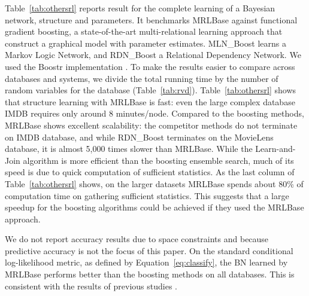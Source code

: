\documentclass{acm_proc_article-sp}
\begin{document}
Table~\ref{tab:othersrl} reports result for the complete learning of a Bayesian network, structure and parameters. It
benchmarks MRLBase against functional gradient boosting, a state-of-the-art  multi-relational learning approach that construct a graphical model with parameter estimates\cite{Natarajan2012}. MLN\_Boost learns a Markov Logic Network, and RDN\_Boost a Relational Dependency Network. 
We used the Boostr implementation \cite{Khot2013}. To make the results easier to compare across databases and systems, we divide the total running time by the number of random variables for the database (Table~\ref{tab:rvd}). Table~\ref{tab:othersrl} shows that structure learning with MRLBase is fast: even the large complex database IMDB requires only around 8 minutes/node. Compared to the boosting methods, MRLBase shows excellent scalability: the competitor methods do not terminate on IMDB database, and while RDN\_Boost terminates on the MovieLens database, it is almost 5,000 times slower than MRLBase. While the Learn-and-Join algorithm is more efficient than the boosting ensemble search, much of its speed is due to quick computation of sufficient statistics. As the last column of Table~\ref{tab:othersrl} shows, on the larger datasets MRLBase spends about 80\% of computation time on gathering sufficient statistics. This suggests that a large  speedup for the boosting algorithms could be achieved if they used the MRLBase approach. 


We do not report accuracy results due to space constraints and because predictive accuracy is not the focus of this paper. On the standard conditional log-likelihood metric, as defined by Equation~\ref{eq:classify}, the BN learned by MRLBase performs better than the boosting methods on all databases. This is consistent with the results of previous studies \cite{Schulte2012}.

\begin{table}[htbp]
  \centering
        \caption{Learning Time Comparison with other multi-relational learning systems. Unless otherwise noted, times are in seconds.}
  \label{tab:othersrl}%
\end{table}%
\end{document}
